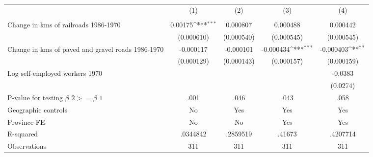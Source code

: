 {
\def\sym#1{\ifmmode^{#1}\else\(^{#1}\)\fi}
\begin{tabular}{l*{4}{c}}
\hline\hline
                &\multicolumn{1}{c}{(1)}&\multicolumn{1}{c}{(2)}&\multicolumn{1}{c}{(3)}&\multicolumn{1}{c}{(4)}\\
                &\multicolumn{1}{c}{}&\multicolumn{1}{c}{}&\multicolumn{1}{c}{}&\multicolumn{1}{c}{}\\
\hline
Change in kms of railroads 1986-1970&  0.00175\sym{***}& 0.000807         & 0.000488         & 0.000442         \\
                &(0.000610)         &(0.000540)         &(0.000545)         &(0.000545)         \\
[1em]
Change in kms of paved and gravel roads 1986-1970&-0.000117         &-0.000101         &-0.000434\sym{***}&-0.000403\sym{**} \\
                &(0.000129)         &(0.000143)         &(0.000157)         &(0.000159)         \\
[1em]
Log self-employed workers 1970&                  &                  &                  &  -0.0383         \\
                &                  &                  &                  & (0.0274)         \\
\hline
P-value for testing $\beta\_{2} >= \beta\_{1}$&     .001         &     .046         &     .043         &     .058         \\
Geographic controls&       No         &      Yes         &      Yes         &      Yes         \\
Province FE     &       No         &       No         &      Yes         &      Yes         \\
R-squared       & .0344842         & .2859519         &   .41673         & .4207714         \\
Observations    &      311         &      311         &      311         &      311         \\
\hline\hline
\end{tabular}
}
